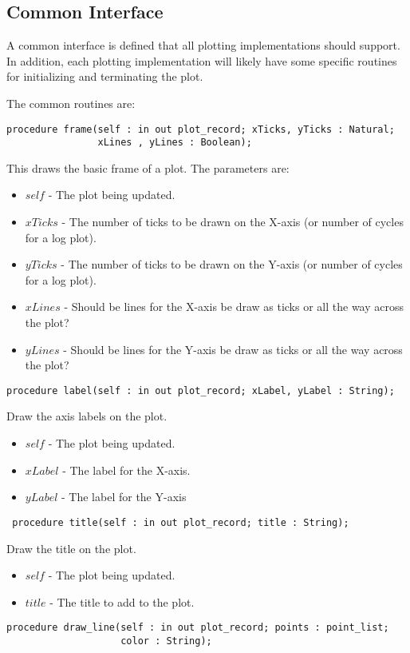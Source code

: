 \documentclass[10pt, openany]{book}
\begin{document}
\subsection{Common Interface}
A common interface is defined that all plotting implementations should support.  In addition, each plotting implementation will likely have some specific routines for initializing and terminating the plot.

The common routines are:
\begin{lstlisting}
procedure frame(self : in out plot_record; xTicks, yTicks : Natural;
                xLines , yLines : Boolean);
\end{lstlisting}
This draws the basic frame of a plot.  The parameters are:
\begin{itemize}
  \item $self$ - The plot being updated.
  \item $xTicks$ - The number of ticks to be drawn on the X-axis (or number of cycles for a log plot).
  \item $yTicks$ - The number of ticks to be drawn on the Y-axis (or number of cycles for a log plot).
  \item $xLines$ - Should be lines for the X-axis be draw as ticks or all the way across the plot?
  \item $yLines$ - Should be lines for the Y-axis be draw as ticks or all the way across the plot?
\end{itemize}
\begin{lstlisting}
procedure label(self : in out plot_record; xLabel, yLabel : String);
\end{lstlisting}
Draw the axis labels on the plot.
\begin{itemize}
  \item $self$ - The plot being updated.
  \item $xLabel$ - The label for the X-axis.
  \item $yLabel$ - The label for the Y-axis
\end{itemize}
\begin{lstlisting}
 procedure title(self : in out plot_record; title : String);
\end{lstlisting}
Draw the title on the plot.
\begin{itemize}
  \item $self$ - The plot being updated.
  \item $title$ - The title to add to the plot.
\end{itemize}
\begin{lstlisting}
procedure draw_line(self : in out plot_record; points : point_list;
                    color : String);
\end{lstlisting}
\end{document}

